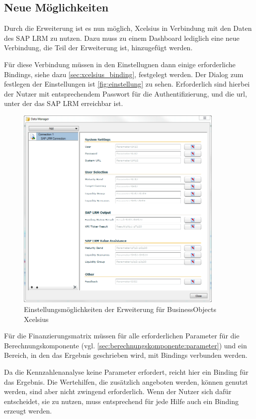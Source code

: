\begin{onehalfspacing}
\section{Neue Möglichkeiten}
Durch die Erweiterung ist es nun möglich, \gls{Xcelsius} in Verbindung mit den Daten des SAP LRM zu nutzen. Dazu muss zu einem Dashboard lediglich eine neue Verbindung, die Teil der Erweiterung ist, hinzugefügt werden.

Für diese Verbindung müssen in den Einstellugnen dann einige erforderliche Bindings, siehe dazu \vref{sec:xcelsius_binding}, festgelegt werden. Der Dialog zum festlegen der Einstellungen ist  \vref{fig:einstellung} zu sehen. Erforderlich sind hierbei der Nutzer mit entsprechendem Passwort für die Authentifizierung, und die \gls{url}, unter der das SAP LRM erreichbar ist.

\begin{figure}[h]
\centering
\setlength{\unitlength}{1mm}
\includegraphics[width=10cm]{images/xcelsius_einstellungen.PNG}
\caption{Einstellungsmöglichkeiten der Erweiterung für BusinessObjects Xcelsius\label{fig:einstellung}}
\end{figure} 

Für die Finanzierungsmatrix müssen für alle erforderlichen Parameter für die Berechnungskomponente (vgl. \vref{sec:berechnungskomponente:parameter}) und ein Bereich, in den das Ergebnis geschrieben wird, mit Bindings verbunden werden.

Da die Kennzahlenanalyse keine Parameter erfordert, reicht hier ein Binding für das Ergebnis. Die Wertehilfen, die zusätzlich angeboten werden, können genutzt werden, sind aber nicht zwingend erforderlich. Wenn der Nutzer sich dafür entscheidet, sie zu nutzen, muss entsprechend für jede Hilfe auch ein Binding erzeugt werden.


\end{onehalfspacing}
